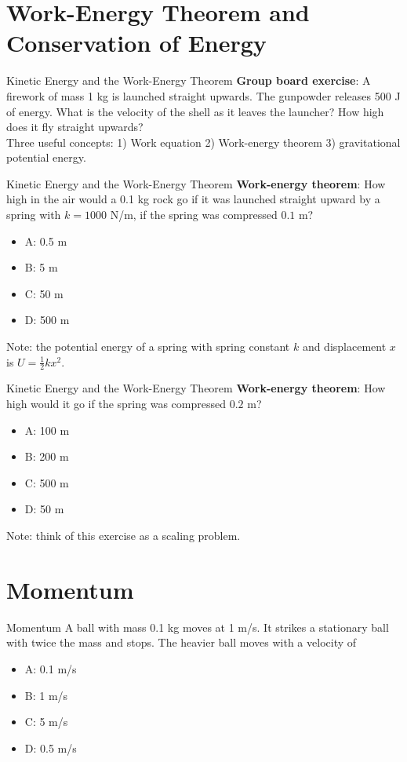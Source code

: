 \documentclass{beamer}
\begin{document}
\section{Work-Energy Theorem and Conservation of Energy}

\begin{frame}{Kinetic Energy and the Work-Energy Theorem}
\textbf{Group board exercise}: A firework of mass 1 kg is launched straight upwards.  The gunpowder releases 500 J of energy.  What is the velocity of the shell as it leaves the launcher?  How high does it fly straight upwards? \\ \vspace{0.5cm}
Three useful concepts: 1) Work equation 2) Work-energy theorem 3) gravitational potential energy.
\end{frame}

\begin{frame}{Kinetic Energy and the Work-Energy Theorem}
\textbf{Work-energy theorem}: How high in the air would a 0.1 kg rock go if it was launched straight upward by a spring with $k=1000$ N/m, if the spring was compressed $0.1$ m?
\begin{itemize}
\item A: 0.5 m
\item B: 5 m
\item C: 50 m
\item D: 500 m
\end{itemize}
Note: the potential energy of a spring with spring constant $k$ and displacement $x$ is $U = \frac{1}{2}k x^2$.
\end{frame}

\begin{frame}{Kinetic Energy and the Work-Energy Theorem}
\textbf{Work-energy theorem}: How high would it go if the spring was compressed $0.2$ m?
\begin{itemize}
\item A: 100 m
\item B: 200 m
\item C: 500 m
\item D: 50 m
\end{itemize}
Note: think of this exercise as a scaling problem.
\end{frame}

\section{Momentum}

\begin{frame}{Momentum}
A ball with mass 0.1 kg moves at 1 m/s.  It strikes a stationary ball with twice the mass and stops.  The heavier ball moves with a velocity of
\begin{itemize}
\item A: 0.1 m/s
\item B: 1 m/s
\item C: 5 m/s
\item D: 0.5 m/s
\end{itemize}
\end{frame}
\end{document}
